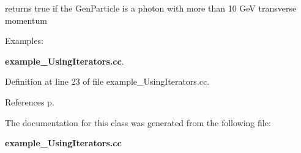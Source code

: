 returns true if the Gen\-Particle is a photon with more than 10 Ge\-V transverse momentum 

\begin{Desc}
\item[Examples: ]\par
{\bf example\_\-Using\-Iterators.cc}.\end{Desc}


Definition at line 23 of file example\_\-Using\-Iterators.cc.

References p.

The documentation for this class was generated from the following file:\begin{CompactItemize}
\item 
{\bf example\_\-Using\-Iterators.cc}\end{CompactItemize}
